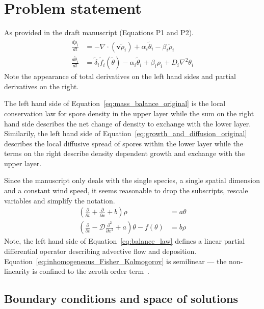 \documentclass[12pt]{amsart}
\begin{document}
\section{Problem statement}

As provided in the draft manuscript (Equations P1 and P2).
\begin{align}
  \frac{d\tilde{\rho}_i}{dt} & = -\nabla \cdot (\mathbf{v}\tilde{\rho}_{i}) +
  \alpha_{i} \tilde{\theta}_{i} -
  \beta_{i}\tilde{\rho}_{i} \label{eq:mass_balance_original}\\
  \frac{d\tilde{\theta}_i}{dt} & = \tilde{\delta}_{i}  \tilde{f}_i(\tilde{\theta}) -
  \alpha_{i} \tilde{\theta}_{i} +
  \beta_{i}\rho_i +
  D_{i}\nabla^2\theta_{i} \label{eq:growth_and_diffusion_original}
\end{align}
Note the appearance of total derivatives on the left hand sides and
partial derivatives on the right.  

The left hand side of Equation~\ref{eq:mass_balance_original} is the 
local conservation law for spore density in the upper layer while
the sum on the right hand side describes the net change of density to
exchange with the lower layer.  Similarily, the left hand side of
Equation~\ref{eq:growth_and_diffusion_original} describes the local diffusive
spread of spores within the lower layer while the terms on the right
describe density dependent growth and exchange with the upper layer.  

Since the manuscript only deals with the single species, a single
spatial dimension and a constant wind speed, it seems reasonable to
drop the subscripts, rescale variables and simplify the notation.  
\begin{align}
  \left(\frac{\partial}{\partial t} +
  \frac{\partial}{\partial x} +
  b\right)\rho &=
  a \theta \label{eq:balance_law}\\
  \left(\frac{\partial}{\partial t} - \mathcal{D}\frac{\partial^2}{\partial x^2}+ a\right)\theta -
  f(\theta) & = b\rho \label{eq:inhomogeneous_Fisher_Kolmogorov}
\end{align}
Note, the left hand side of Equation~\ref{eq:balance_law} defines a
linear partial differential operator describing advective flow and
deposition.  Equation~\ref{eq:inhomogeneous_Fisher_Kolmogorov} is
semilinear --- the non-linearity is confined to the zeroth order
term~\cite{RozhdestvenskiiJanenko:1983}.

\subsection{Boundary conditions and space of solutions}
\end{document}
